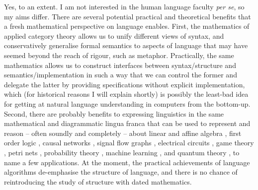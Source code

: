 
Yes, to an extent. I am not interested in the human language faculty \emph{per se}, so my aims differ. There are several potential practical and theoretical benefits that a fresh mathematical perspective on language enables. First, the mathematics of applied category theory allows us to unify different views of syntax, and conservatively generalise formal semantics to aspects of language that may have seemed beyond the reach of rigour, such as metaphor. Practically, the same mathematics allows us to construct interfaces between syntax/structure and semantics/implementation in such a way that we can control the former and delegate the latter by providing specifications without explicit implementation, which (for historical reasons I will explain shortly) is possibly the least-bad idea for getting at natural language understanding in computers from the bottom-up. Second, there are probably benefits to expressing linguistics in the same mathematical and diagrammatic lingua franca that can be used to represent and reason -- often soundly and completely -- about linear and affine algebra \citep{sobocinskiGraphicalLinearAlgebra2015,bonchiInteractingHopfAlgebras2017,bonchiGraphicalAffineAlgebra2019a}, first order logic \citep{haydonCompositionalDiagrammaticFirstOrder2020d,bonchiDiagrammaticAlgebraFirst2024a}, causal networks \citep{lorenzCausalModelsString2023,jacobsCausalInferenceString2019b}, signal flow graphs \citep{bonchiCategoricalSemanticsSignal2014}, electrical circuits \citep{boisseauStringDiagrammaticElectrical2022}, game theory \citep{hedgesStringDiagramsGame2015}, petri nets \citep{baezOpenPetriNets2020}, probability theory \citep{fritzFinettiTheoremCategorical2021}, machine learning \citep{cruttwellCategoricalFoundationsGradientbased2022,khatriAnatomyAttention2024,rodatzPatternLanguageMachine2024}, and quantum theory \citep{coeckePicturingQuantumProcesses2017a,coeckeQuantumPicturesNew2023}, to name a few applications. At the moment, the practical achievements of language algorithms de-emphasise the structure of language, and there is no chance of reintroducing the study of structure with dated mathematics.

\newpage


